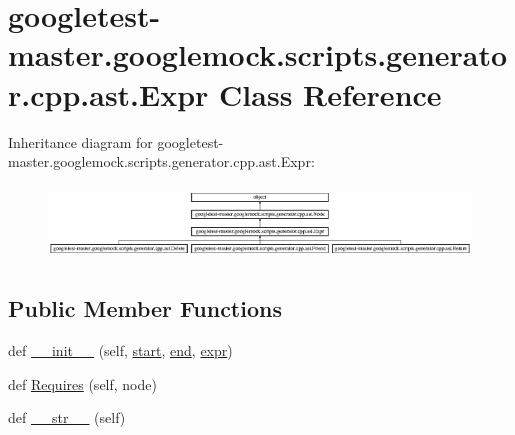 \hypertarget{classgoogletest-master_1_1googlemock_1_1scripts_1_1generator_1_1cpp_1_1ast_1_1_expr}{}\section{googletest-\/master.googlemock.\+scripts.\+generator.\+cpp.\+ast.\+Expr Class Reference}
\label{classgoogletest-master_1_1googlemock_1_1scripts_1_1generator_1_1cpp_1_1ast_1_1_expr}
Inheritance diagram for googletest-\/master.googlemock.\+scripts.\+generator.\+cpp.\+ast.\+Expr\+:\begin{figure}[H]
\begin{center}
\leavevmode
\includegraphics[height=1.975309cm]{df/dd0/classgoogletest-master_1_1googlemock_1_1scripts_1_1generator_1_1cpp_1_1ast_1_1_expr}
\end{center}
\end{figure}
\subsection*{Public Member Functions}
\begin{DoxyCompactItemize}
\item 
def \mbox{\hyperlink{classgoogletest-master_1_1googlemock_1_1scripts_1_1generator_1_1cpp_1_1ast_1_1_expr_a72a12a44b45b087164fed3cea4ce60c0}{\+\_\+\+\_\+init\+\_\+\+\_\+}} (self, \mbox{\hyperlink{classgoogletest-master_1_1googlemock_1_1scripts_1_1generator_1_1cpp_1_1ast_1_1_node_a6f9eb279a989f9ca27e7d0f1975336d1}{start}}, \mbox{\hyperlink{classgoogletest-master_1_1googlemock_1_1scripts_1_1generator_1_1cpp_1_1ast_1_1_node_a747e90ade89c1764e83b5b649bde18cc}{end}}, \mbox{\hyperlink{classgoogletest-master_1_1googlemock_1_1scripts_1_1generator_1_1cpp_1_1ast_1_1_expr_a4a7e7c2a767673d1476a6cb0e4fadff1}{expr}})
\item 
def \mbox{\hyperlink{classgoogletest-master_1_1googlemock_1_1scripts_1_1generator_1_1cpp_1_1ast_1_1_expr_a8c69a2f1475d4ffc7bcff97ad50a4fb0}{Requires}} (self, node)
\item 
def \mbox{\hyperlink{classgoogletest-master_1_1googlemock_1_1scripts_1_1generator_1_1cpp_1_1ast_1_1_expr_a46af5fd236f53f836b27c6aac3c3d790}{\+\_\+\+\_\+str\+\_\+\+\_\+}} (self)
\end{DoxyCompactItemize}
